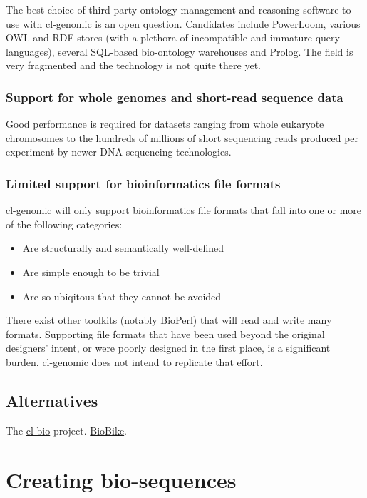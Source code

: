 \documentclass[a4paper, 12pt]{article}
\begin{document}
The best choice of third-party ontology management and reasoning
software to use with cl-genomic is an open question. Candidates
include PowerLoom, various OWL and RDF stores (with a plethora of
incompatible and immature query languages), several SQL-based
bio-ontology warehouses and Prolog. The field is very fragmented and
the technology is not quite there yet.


\subsubsection{Support for whole genomes and short-read sequence data}

Good performance is required for datasets ranging from whole eukaryote
chromosomes to the hundreds of millions of short sequencing reads
produced per experiment by newer DNA sequencing technologies.


\subsubsection{Limited support for bioinformatics file formats}
\label{sec:bioformats}

cl-genomic will only support bioinformatics file formats that fall
into one or more of the following categories:

\begin{itemize}
\item Are structurally and semantically well-defined
\item Are simple enough to be trivial
\item Are so ubiqitous that they cannot be avoided
\end{itemize}

There exist other toolkits (notably BioPerl) that will read and write
many formats. Supporting file formats that have been used beyond the
original designers' intent, or were poorly designed in the first
place, is a significant burden. cl-genomic does not intend to
replicate that effort.

\subsection{Alternatives}
\label{sec:alternate}

The \href{http://common-lisp.net/project/cl-bio}{cl-bio} project.
\href{http://www.biolisp.org}{BioBike}.


\section{Creating bio-sequences}
\label{sec:makinging-bioseq}
\end{document}
